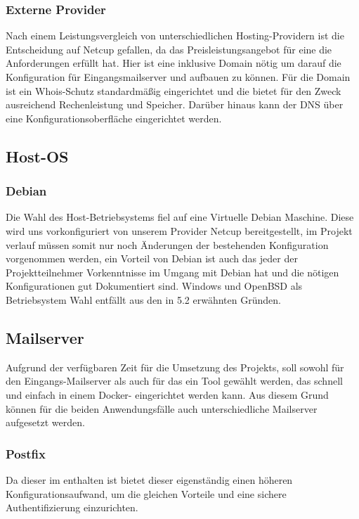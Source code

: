 \documentclass[a4paper,11pt,singlespacing]{article}
\begin{document}
		\subsubsection{Externe Provider}\label{sec:AuswahlLösungExterneProvider}
			Nach einem Leistungsvergleich von unterschiedlichen Hosting-Providern ist die Entscheidung auf \textsf{Netcup} gefallen, da das Preisleistungsangebot für eine  die Anforderungen erfüllt hat.
			Hier ist eine  inklusive Domain nötig um darauf die Konfiguration für Eingangsmailserver und  aufbauen zu können.
			Für die Domain ist ein Whois-Schutz standardmäßig eingerichtet und die  bietet für den Zweck ausreichend Rechenleistung und Speicher. Darüber hinaus kann der DNS über eine Konfigurationsoberfläche eingerichtet werden.
			
			

	\subsection{Host-OS}\label{sec:AuswahlLösungHost-Maschine}
	\subsubsection{Debian}\label{sec:Debian}
			Die Wahl des Host-Betriebsystems fiel auf eine Virtuelle Debian Maschine.
			Diese wird uns vorkonfiguriert von unserem Provider Netcup bereitgestellt, im Projekt verlauf müssen somit nur noch Änderungen der bestehenden Konfiguration vorgenommen werden, ein Vorteil von Debian ist auch das jeder der Projektteilnehmer Vorkenntnisse im Umgang mit Debian hat und die nötigen Konfigurationen gut Dokumentiert sind.
Windows und OpenBSD als Betriebsystem Wahl entfällt aus den in 5.2 erwähnten Gründen.

	\subsection{Mailserver}\label{sec:AuswahlLösungMailserver}
		Aufgrund der verfügbaren Zeit für die Umsetzung des Projekts, soll sowohl für den Eingangs-Mailserver als auch für das  ein Tool gewählt werden, das schnell und einfach in einem Docker-	eingerichtet werden kann. Aus diesem Grund können für die beiden Anwendungsfälle auch unterschiedliche Mailserver aufgesetzt werden.
		
		\subsubsection{Postfix}\label{sec:AuswahlLösungPostfix}	
			Da dieser im  enthalten ist bietet dieser eigenständig einen höheren Konfigurationsaufwand, um die gleichen Vorteile und eine sichere Authentifizierung einzurichten.
			
\end{document}
